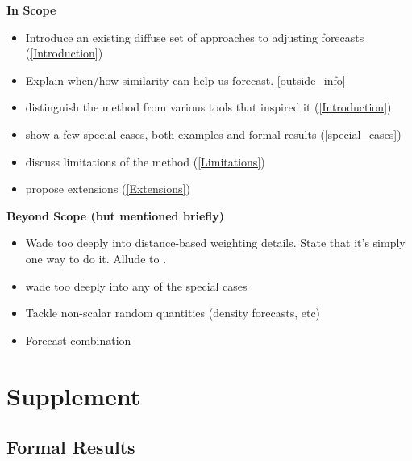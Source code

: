 \documentclass[11pt]{article}
\theoremstyle{definition}
\begin{document}
\textbf{In Scope}
\begin{itemize}
  \item Introduce an existing diffuse set of approaches to adjusting forecasts (\ref{Introduction})
  \item Explain when/how similarity can help us forecast. \ref{outside_info}
  \item distinguish the method from various tools that inspired it (\ref{Introduction})
  \item show a few special cases, both examples and formal results (\ref{special_cases})
  \item discuss limitations of the method (\ref{Limitations})
  \item propose extensions (\ref{Extensions})
\end{itemize}
\textbf{Beyond Scope (but mentioned briefly)}
\begin{itemize}
  \item Wade too deeply into distance-based weighting details.  State that it's simply one way to do it.  Allude to \cite{lin2021minimizing,lundquist2024volatility}.
  \item wade too deeply into any of the special cases
  \item Tackle non-scalar random quantities (density forecasts, etc)
  \item Forecast combination
\end{itemize}

\section{Supplement}


\subsection{Formal Results}
\end{document}
